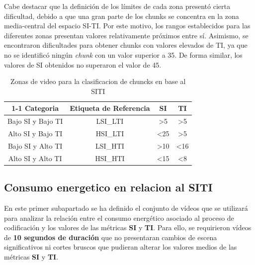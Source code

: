 Cabe destacar que la definición de los límites de cada zona presentó cierta dificultad, debido a que una gran parte de los chunks se concentra en la zona media-central del espacio SI-TI. Por este motivo, los rangos establecidos para las diferentes zonas presentan valores relativamente próximos entre sí. Asimismo, se encontraron dificultades para obtener chunks con valores elevados de TI, ya que no se identificó ningún \textit{chunk} con un valor superior a 35. De forma similar, los valores de SI obtenidos no superaron el valor de 45.


\begin{table}[h]
     \centering
     \begin{tabular}{|c|ccc}
     \cline{1-1}
     \rowcolor[HTML]{9B9B9B} 
     \textbf{Categoria} & \textbf{Etiqueta de Referencia} & \textbf{SI}                          & \textbf{TI}                         \\ \hline
     Bajo SI y Bajo TI  & \multicolumn{1}{c|}{LSI\_LTI}   & \multicolumn{1}{c|}{\textgreater 5}  & \multicolumn{1}{c|}{\textgreater 5} \\ \hline
     Alto SI y Bajo TI  & \multicolumn{1}{c|}{HSI\_LTI}   & \multicolumn{1}{c|}{\textless 25}    & \multicolumn{1}{c|}{\textgreater 5} \\ \hline
     Bajo SI y Alto TI  & \multicolumn{1}{c|}{LSI\_HTI}   & \multicolumn{1}{c|}{\textgreater 10} & \multicolumn{1}{c|}{\textless 16}   \\ \hline
     Alto SI y Alto TI  & \multicolumn{1}{c|}{HSI\_HTI}   & \multicolumn{1}{c|}{\textless 15}    & \multicolumn{1}{c|}{\textless 8}    \\ \hline
     \end{tabular}
     \label{tab:siti-zones-definition}
     \caption{Zonas de video para la clasificacion de chuncks en base al SITI}
\end{table}

\subsection{Consumo energetico en relacion al SITI}\label{section:exp2.2-sitixconsumo}
En este primer subapartado se ha definido el conjunto de vídeos que se utilizará para analizar la relación entre el consumo energético asociado al proceso de codificación y los valores de las métricas \textbf{SI} y \textbf{TI}. Para ello, se requirieron vídeos de \textbf{10 segundos de duración} que no presentaran cambios de escena significativos ni cortes bruscos que pudieran alterar los valores medios de las métricas \textbf{SI} y \textbf{TI}. 

